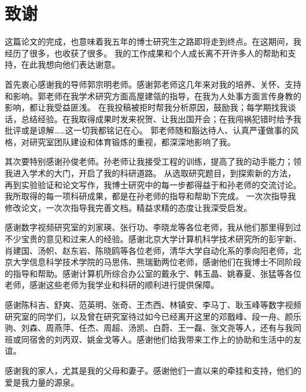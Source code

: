 \chapter{致谢}

这篇论文的完成，也意味着我五年的博士研究生之路即将走到终点。在这期间，我经历了很多，也收获了很多。
我的工作成果和个人成长离不开许多人的帮助和支持，在此我想向他们表达谢意。

首先衷心感谢我的导师郭宗明老师。感谢郭老师这几年来对我的培养、关怀、支持和影响。郭老师在我学术研究方面高屋建瓴的指导，在我为人处事方面言传身教的影响，都让我受益匪浅。
在我投稿被拒时帮我分析原因，鼓励我；每学期找我谈话，总结经验。在我取得成果时发来祝贺、让我出国开会；在我闯祸犯错时给予我批评或是谅解……这一切我都铭记在心。
郭老师随和豁达待人、认真严谨做事的风格，对研究室团队建设和体育锻炼的重视，都深深地影响了我。

其次要特别感谢孙俊老师。孙老师让我接受工程的训练，提高了我的动手能力；领我进入学术的大门，开启了我的科研道路。
从选取研究题目，到探索新的方法，再到实验验证和论文写作，我博士研究中的每一步都得益于和孙老师的交流讨论。我所取得的每一项科研成果，都是在孙老师的指导和帮助下完成。
一次次指导我修改论文，一次次指导我完善文档。精益求精的态度让我深受启发。

感谢数字视频研究室的刘家瑛、张行功、李晓龙等各位老师，我从他们那里得到过不少宝贵的意见和过来人的经验。感谢北京大学计算机科学技术研究所的彭宇新、肖建国、汤帜、赵东岩、陈晓鸥等各位老师，清华大学自动化系的季向阳老师，北京大学信息科学技术学院的马思伟、熊瑞勤两位老师，感谢他们在我博士不同阶段的指导和帮助。感谢计算机所综合办公室的戴永宁、韩玉晶、姚春夏、张猛等各位老师，感谢这些老师为我学业和科研的顺利进行提供保障。

感谢陈科吉、舒爽、范英明、张奇、王杰西、林镇安、李马丁、耿玉峰等数字视频研究室的同学们，以及曾在研究室待过如今已经离开这里的邓戬峰、段一舟、颜乐驹、刘森、周燕萍、任杰、周超、汤凯、白蔚、王一磊、张文尧等人，还有与我同班或同宿舍的刘丙双、姚金戈等人。感谢他们给我带来工作上的协助和生活中的友谊。

感谢我的家人，尤其是我的父母和妻子。感谢他们一直以来的牵挂和支持，他们的爱是我力量的源泉。